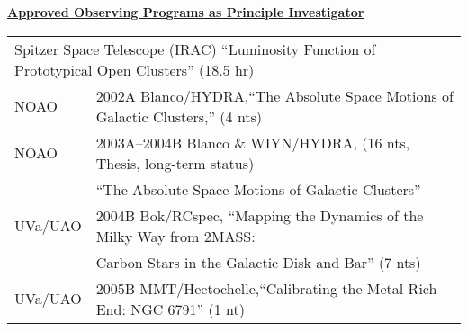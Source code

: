 \documentclass[12pt]{article}
\begin{document}
\noindent \underline{\bf Approved Observing Programs as Principle Investigator} \\
\noindent \begin{tabular}{ll}
\multicolumn{2}{l}{Spitzer Space Telescope (IRAC) ``Luminosity Function of Prototypical Open Clusters'' (18.5 hr)}\\
NOAO & 2002A Blanco/HYDRA,``The Absolute Space Motions of Galactic Clusters,'' (4 nts)   \\
 NOAO & 2003A--2004B Blanco \& WIYN/HYDRA, (16 nts, Thesis, long-term status) \\
&``The Absolute Space Motions of Galactic Clusters''  \\
UVa/UAO & 2004B Bok/RCspec, ``Mapping the Dynamics of the Milky Way from 2MASS:  \\   
& Carbon Stars in the Galactic Disk and Bar'' (7 nts) \\   
UVa/UAO & 2005B MMT/Hectochelle,``Calibrating the Metal Rich End: NGC 6791'' (1 nt)\\
\end{tabular}\\

\end{document}

